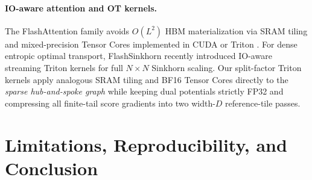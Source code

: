 \documentclass[11pt]{article}
\begin{document}
\paragraph{IO-aware attention and OT kernels.}
The FlashAttention family \citep{dao2022flashattention,dao2023flashattention2,shah2024flashattention3} avoids $O(L^2)$ HBM materialization via SRAM tiling and mixed-precision Tensor Cores implemented in CUDA or Triton \citep{triton2019tillet}. For dense entropic optimal transport, FlashSinkhorn \citep{flashsinkhorn2026} recently introduced IO-aware streaming Triton kernels for full $N\times N$ Sinkhorn scaling. Our split-factor Triton kernels apply analogous SRAM tiling and BF16 Tensor Cores directly to the \emph{sparse hub-and-spoke graph} while keeping dual potentials strictly FP32 and compressing all finite-tail score gradients into two width-$D$ reference-tile passes.

\section{Limitations, Reproducibility, and Conclusion}
\label{sec:conclusion}
\end{document}
